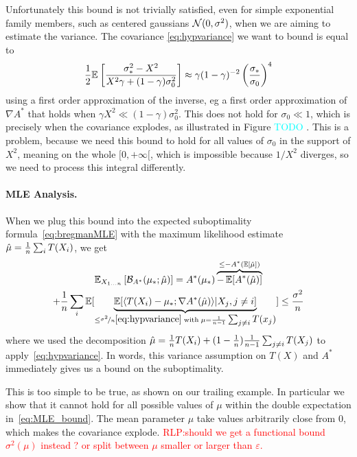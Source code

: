 \documentclass{article}
\newcommand{\RLP}[1]{\textcolor{red}{RLP:#1}}
\newcommand{\TODO}[1]{\textcolor{cyan}{TODO #1}}
\newcommand*{\expect}[2][]{\ensuremath{\mathbb{E}_{#1} \left[ #2 \right] }} %
\newcommand{\logpart}{A}
\newcommand{\conj}{\logpart^*}
\newcommand{\bregmanconj}{\cB_{\logpart^*}}
\newcommand{\lr}{\gamma} %
\begin{document}
\begin{example}
Unfortunately this bound is not trivially satisfied, even for simple exponential family members, such as centered gaussians ${\mathcal N}(0,\sigma^2)$, when we are aiming to estimate the variance.
The covariance  \eqref{eq:hypvariance} we want to bound is equal to
\begin{align}
	\half \expect{\frac{\sigma_*^2 - X^2 }{ X^2 \lr + (1-\lr) \sigma_0^2 }}
	\approx \lr (1-\lr)^{-2} \left (\frac{\sigma_*}{\sigma_0} \right)^4
\end{align}
using a first order approximation of the inverse, eg a first order approximation of $\nabla \conj$ that holds when $\lr X^2 \ll (1-\lr) \sigma_0^2$. This does not hold for $\sigma_0\ll 1$, which is precisely when the covariance  explodes, as illustrated in Figure \TODO{}. This is a problem, because we need this bound to hold  for all values of $\sigma_0$ in the support of $X^2$, meaning on the whole $[0,+\infty[$, which is impossible because $1/X^2$ diverges, so we need to process this integral differently.   
\end{example}

\paragraph{MLE Analysis.}
When we plug this bound into the expected suboptimality formula~\eqref{eq:bregmanMLE} with the maximum likelihood estimate $\hat \mu =  \frac{1}{n}\sum_i T(X_i)$, we get
\begin{multline}
	\expect[X_{1\dots n}]{\bregmanconj ( \mu_* ;\hat \mu) }
	=\conj(\mu_*) \overbrace{- \E[\conj(\hat \mu)]}^{\leq - \conj(\E[\hat \mu])} \\
	+ \inv{n}\sum_i \E[\underbrace{\E[\langle  T(X_i) - \mu_*; \nabla\conj (\hat \mu) \rangle | X_j, j\neq i]}_{\leq \nicefrac{\sigma^2}{n} \eqref{eq:hypvariance}
	 	\; \text{with}\; \mu=\inv{n-1}\smallsum_{j\neq i} T(x_j)  } ]  \leq \frac{\sigma^2}{n}
\label{eq:MLE_bound}
\end{multline}
where we used the decomposition $\hat \mu = \frac{1}{n}T(X_i) + (1-\frac{1}{n}) \frac{1}{n-1} \sum_{j\neq i}T(X_j)$ to apply~\eqref{eq:hypvariance}. 
In words, this variance assumption on $T(X)$ and $\conj$ immediately gives us a bound on the suboptimality. 

This is too simple to be true, as shown on our trailing example.
In particular we show that it cannot hold for all possible values of $\mu$ within the double expectation in~\eqref{eq:MLE_bound}.
The mean parameter $\mu$ take values arbitrarily close from $0$, which makes the covariance explode.
\RLP{should we get a functional bound $\sigma^2(\mu)$ instead ? or split between $\mu$ smaller or larger than $\varepsilon$.}
\end{document}
